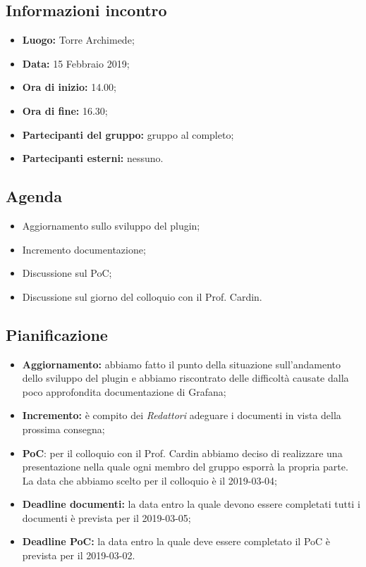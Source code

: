 \subsection{Informazioni incontro}
\begin{itemize}
	\item { \textbf{Luogo:} Torre Archimede};
	\item { \textbf{Data:} 15 Febbraio 2019};
	\item { \textbf{Ora di inizio:} 14.00};
	\item { \textbf{Ora di fine:} 16.30};
	\item { \textbf{Partecipanti del gruppo:} gruppo al completo};
	\item { \textbf{Partecipanti esterni:} nessuno}.
\end{itemize}


\subsection{Agenda}
\begin{itemize}
	\item {Aggiornamento sullo sviluppo del plugin;}
	\item {Incremento documentazione;}
	\item {Discussione sul PoC;}
	\item {Discussione sul giorno del colloquio con il Prof. Cardin.}
\end{itemize}

\subsection{Pianificazione}
\begin{itemize}
	\item { \textbf{Aggiornamento:} abbiamo fatto il punto della situazione sull'andamento dello sviluppo del plugin e abbiamo riscontrato delle difficoltà causate dalla poco approfondita documentazione di Grafana;}
	\item { \textbf{Incremento:} è compito dei \emph{Redattori} adeguare i documenti  in vista della prossima consegna;}
	\item { \textbf{PoC}: per il colloquio con il Prof. Cardin abbiamo deciso di realizzare una presentazione nella quale ogni membro del gruppo esporrà la propria parte. La data che abbiamo scelto per il colloquio è il 2019-03-04;}
	\item { \textbf{Deadline documenti:} la data entro la quale devono essere completati tutti i documenti è prevista per il 2019-03-05;}
	\item { \textbf{Deadline PoC:} la data entro la quale deve essere completato il PoC è prevista per il 2019-03-02.}
\end{itemize}

